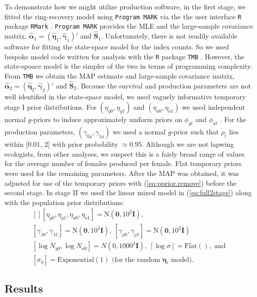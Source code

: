 \documentclass[12pt]{article}
\newcommand{\bn}{\boldsymbol{\eta}}
\newcommand{\bg}{\boldsymbol{\gamma}}
\newcommand{\ba}{\boldsymbol{\alpha}}
\newcommand{\bS}{\mathbf{S}}
\newcommand{\tN}{\text{N}}
\newcommand{\bI}{\mathbf{I}}
\begin{document}
To demonstrate how we might utilize production software, in the first stage, we fitted the ring-recovery model using {\tt Program  MARK} \citep{white1999program} via the the user interface {\tt R} package {\tt RMark} \citep{laake2013:RMark}. {\tt Program  MARK} provides the MLE and the large-sample covariance matrix, $\hat{\ba}_1 = (\hat{\bn}_1, \hat{\bg}_1)'$ and $\hat{\bS}_1$. Unfortunately, there is not readily available software for fitting the state-space model for the index counts. So we used bespoke model code written for analysis with the {\tt R} package {\tt TMB} \citep{kristensen2016tmb}. However, the state-spoace model is the simpler of the two in terms of programming complexity. From {\tt TMB} we obtain the MAP estimate and large-sample covariance matrix, $\hat{\ba}_2 = (\hat{\bn}_2, \hat{\bg}_2)'$ and $\hat{\bS}_2$. Because the survival and production parameters are not well identified in the state-space model, we used vaguely informative temporary stage I prior distributions. For $(\eta_{y0},\eta_{y1})$ and $(\eta_{a0},\eta_{a1})$ we used independent normal $g$-priors to induce approximately uniform priors on $\phi_{yt}$ and $\phi_{at}$ \citep{hanson2014informative}. For the production parameters, $(\gamma_{0\rho},\gamma_{1\rho})$ we used a normal $g$-prior such that $\rho_t$ lies within [0.01, 2] with prior probability $\approx 0.95$. Although we are not lapwing ecologists, from other analyses, we suspect this is a fairly broad range of values for the average number of females produced per female. Flat temporary priors were used for the remaining parameters. After the MAP was obtained, it was adjusted for use of the temporary priors with (\ref{eq:pprior.remove}) before the second stage. In stage II we used the linear mixed model in (\ref{eq:full2stage}) along with the population prior distributions:
\[
\begin{gathered}[]
[\eta_{y0}, \eta_{y1}, \eta_{a0}, \eta_{a1}] = \tN(\mathbf{0}, 10^2\bI),\\
[\gamma_{\lambda 0}, \gamma_{\lambda 1}] = \tN(\mathbf{0}, 10^2\bI),\ [\gamma_{\rho 0}, \gamma_{\rho 1}] = \tN(\mathbf{0}, 10^2\bI) \\
[\log N_{y0}, \log N_{a0}] = N(0, 1000^2\bI),\ [\log\sigma] = \text{Flat}(), \text{ and}\\
[\sigma_\eta] = \text{Exponential}(1) \text{ (for the random $\bn_i$ model)}.
\end{gathered}
\] 

\subsection{Results} 
\end{document}
